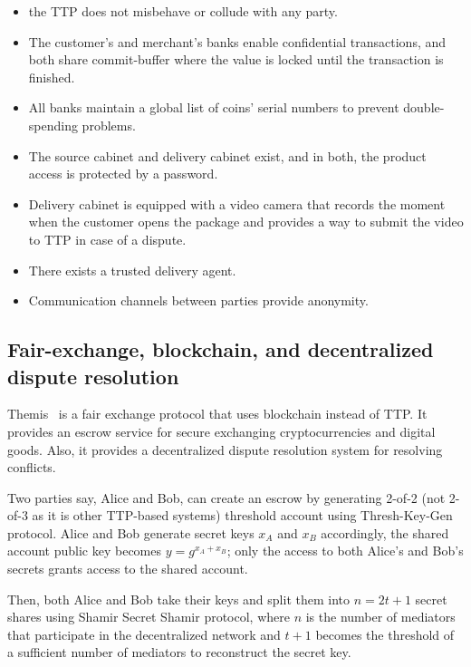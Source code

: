 \documentclass{ieeeaccess}
\begin{document}
\begin{itemize}
    \item the TTP does not misbehave or collude with any party. 
    \item The customer's and merchant's banks enable confidential transactions, and both share commit-buffer where the value is locked until the transaction is finished.   
    \item All banks maintain a global list of coins' serial numbers to prevent double-spending problems. 
    \item The source cabinet and delivery cabinet exist, and in both, the product access is protected by a password.
    \item Delivery cabinet is equipped with a video camera that records the moment when the customer opens the package and provides a way to submit the video to TTP in case of a dispute. 
    \item There exists a trusted delivery agent.
    \item Communication channels between parties provide anonymity.
\end{itemize}

\subsection{Fair-exchange, blockchain, and decentralized dispute resolution}
\label{themis-towards-decentralized-escrow-of-cryptocurrencies-without-trusted-third-parties}

Themis~\cite{meng2019themis} is a fair exchange
protocol that uses blockchain instead of TTP. It provides an escrow
service for secure exchanging cryptocurrencies and digital goods. Also, it provides a decentralized dispute resolution system for resolving conflicts.

Two parties say, Alice and Bob, can create an escrow by generating
2-of-2 (not 2-of-3 as it is other TTP-based systems) threshold account
using Thresh-Key-Gen protocol. Alice and Bob generate secret keys
\(x_A\) and \(x_B\) accordingly, the shared account public key becomes
\(y = g^{x_A+x_B}\); only the access to both Alice's and Bob's secrets
grants access to the shared account.

Then, both Alice and Bob take their keys and split them into
\(n=2t+1\) secret shares using Shamir Secret Shamir protocol, where
\(n\) is the number of mediators that participate in the decentralized
network and \(t+1\) becomes the threshold of a sufficient number of mediators to reconstruct the secret key.
\end{document}

